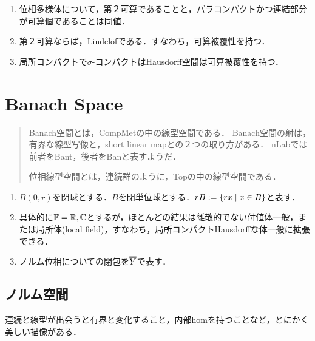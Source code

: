 \documentclass[uplatex,dvipdfmx]{jsreport}
\begin{document}
\begin{proposition}\mbox{}
    \begin{enumerate}
        \item 位相多様体について，第２可算であることと，パラコンパクトかつ連結部分が可算個であることは同値．
        \item 第２可算ならば，Lindelöfである．すなわち，可算被覆性を持つ．
        \item 局所コンパクトで$\sigma$-コンパクトはHausdorff空間は可算被覆性を持つ．
    \end{enumerate}
\end{proposition}

\chapter{Banach Space}

\begin{quotation}
    Banach空間とは，CompMetの中の線型空間である．
    Banach空間の射は，有界な線型写像と，short linear mapとの２つの取り方がある．
    nLabでは前者をBant，後者をBanと表すようだ．

    位相線型空間とは，連続群のように，Topの中の線型空間である．
\end{quotation}

\begin{notation}\mbox{}
    \begin{enumerate}
        \item $B(0,r)$を閉球とする．$B$を閉単位球とする．$rB:=\left\{rx\mid x\in B\right\}$と表す．
        \item 具体的に$\mathbb{F}=\mathbb{R},\mathbb{C}$とするが，ほとんどの結果は離散的でない付値体一般，または局所体(local field)，すなわち，局所コンパクトHausdorffな体一般に拡張できる．
        \item ノルム位相についての閉包を$\dbloverline{Y}$で表す．
    \end{enumerate}
\end{notation}

\section{ノルム空間}

\begin{tcolorbox}[colframe=ForestGreen, colback=ForestGreen!10!white,breakable,colbacktitle=ForestGreen!40!white,coltitle=black,fonttitle=\bfseries\sffamily,
title=]
    連続と線型が出会うと有界と変化すること，内部homを持つことなど，とにかく美しい描像がある．
\end{tcolorbox}
\end{document}
